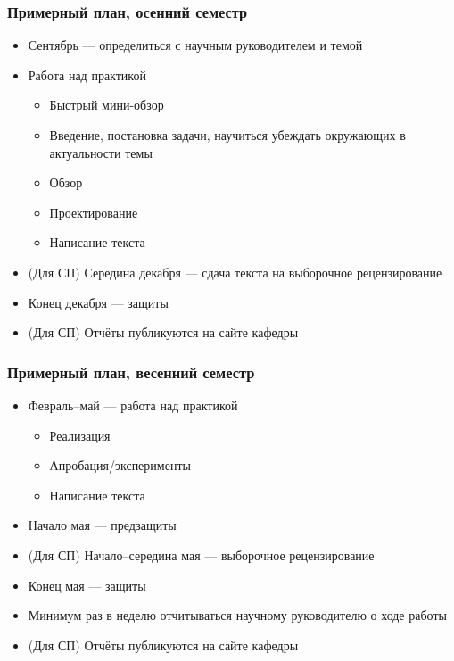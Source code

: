 \documentclass{../../slides-style}
\begin{document}
    \begin{frame}
        \frametitle{Примерный план, осенний семестр}
        \begin{itemize}
            \item Сентябрь --- определиться с научным руководителем и темой
            \item Работа над практикой
            \begin{itemize}
                \item Быстрый мини-обзор
                \item Введение, постановка задачи, научиться убеждать окружающих в актуальности темы
                \item Обзор
                \item Проектирование
                \item Написание текста
            \end{itemize}
            \item (Для СП) Середина декабря --- сдача текста на выборочное рецензирование
            \item Конец декабря --- защиты
            \item (Для СП) Отчёты публикуются на сайте кафедры
        \end{itemize}
    \end{frame}

    \begin{frame}
        \frametitle{Примерный план, весенний семестр}
        \begin{itemize}
            \item Февраль--май --- работа над практикой
            \begin{itemize}
                \item Реализация
                \item Апробация/эксперименты
                \item Написание текста
            \end{itemize}
            \item Начало мая --- предзащиты
            \item (Для СП) Начало--середина мая --- выборочное рецензирование
            \item Конец мая --- защиты
            \item Минимум раз в неделю отчитываться научному руководителю о ходе работы
            \item (Для СП) Отчёты публикуются на сайте кафедры
        \end{itemize}
    \end{frame}
\end{document}
